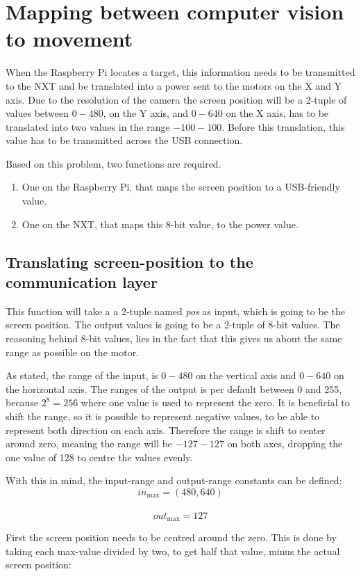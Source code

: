 \section{Mapping between computer vision to movement}
When the Raspberry Pi locates a target, this information needs to be transmitted to the NXT and be translated into a power sent to the motors on the X and Y axis.
Due to the resolution of the camera the screen position will be a 2-tuple of values between $0 - 480$, on the Y axis, and $0 - 640$ on the X axis, has to be translated into two values in the range $-100 - 100$.
Before this translation, this value has to be transmitted across the USB connection.

Based on this problem, two functions are required. 
\begin{enumerate}
	\item One on the Raspberry Pi, that maps the screen position to a USB-friendly value.
	\item One on the NXT, that maps this 8-bit value, to the power value.
\end{enumerate}


\subsection{Translating screen-position to the communication layer}
This function will take a a 2-tuple named \textit{pos} as input, which is going to be the screen position.
The output values is going to be a 2-tuple of 8-bit values.
The reasoning behind 8-bit values, lies in the fact that this gives us about the same range as possible on the motor.

As stated, the range of the input, is $0 - 480$ on the vertical axis and $0 - 640$ on the horizontal axis.
The ranges of the output is per default between 0 and 255, because $2^8 = 256 $ where one value is used to represent the zero.
It is beneficial to shift the range, so it is possible to represent negative values, to be able to represent both direction on each axis.
Therefore the range is shift to center around zero, meaning the range will be $-127 - 127$ on both axes, dropping the one value of 128 to centre the values evenly.

With this in mind, the input-range and output-range constants can be defined:\\
$$in_\text{max} = (480,640)$$\\
$$out_\text{max} = 127$$

First the screen position needs to be centred around the zero. This is done by taking each max-value divided by two, to get half that value, minus the actual screen position:


